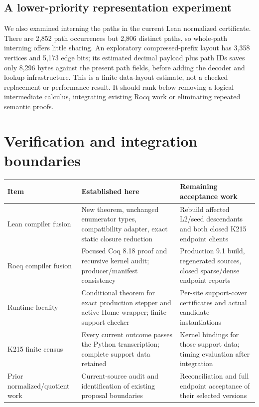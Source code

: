 \documentclass[11pt]{article}
\theoremstyle{definition}\newtheorem{definition}[theorem]{Definition}
\begin{document}
\subsection{A lower-priority representation experiment}

We also examined interning the paths in the current Lean normalized certificate.
There are 2,852 path occurrences but 2,806 distinct paths, so whole-path interning
offers little sharing. An exploratory compressed-prefix layout has 3,358
vertices and 5,173 edge bits; its estimated decimal payload plus path IDs saves
only 8,296 bytes against the present path fields, before adding the decoder and
lookup infrastructure. This is a finite data-layout estimate, not a checked
replacement or performance result. It should rank below removing a logical
intermediate calculus, integrating existing Rocq work or eliminating repeated
semantic proofs.

\section{Verification and integration boundaries}

\begingroup\small
\begin{longtable}{@{}p{}p{}p{}@{}}
\toprule
Item & Established here & Remaining acceptance work\\
\midrule\endhead
Lean compiler fusion & New theorem, unchanged enumerator types, compatibility
adapter, exact static closure reduction & Rebuild affected L2/seed descendants
and both closed K215 endpoint clients\\
Rocq compiler fusion & Focused Coq 8.18 proof and recursive kernel audit;
producer/manifest consistency & Production 9.1 build, regenerated sources,
closed sparse/dense endpoint reports\\
Runtime locality & Conditional theorem for exact production stepper and active
Home wrapper; finite support checker & Per-site support-cover certificates and
actual candidate instantiations\\
K215 finite census & Every current outcome passes the Python transcription;
complete support data retained & Kernel bindings for those support data; timing
evaluation after integration\\
Prior normalized/quotient work & Current-source audit and identification of
existing proposal boundaries & Reconciliation and full endpoint acceptance of
their selected versions\\
\bottomrule
\end{longtable}
\endgroup
\end{document}
